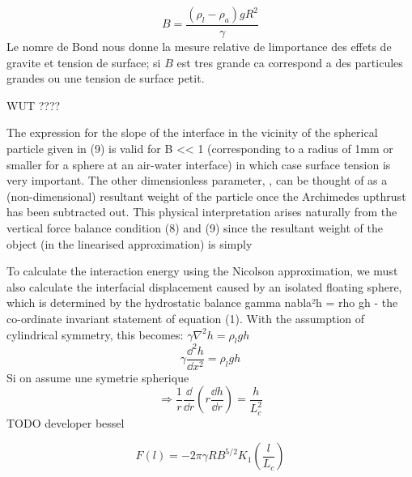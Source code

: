     \begin{equation}
        B = \frac{(\rho_l-\rho_{a})gR^2}{\gamma}
    \end{equation}
    Le nomre de Bond nous donne la mesure relative de limportance des effets de gravite et tension de surface; si $B$ est tres grande ca correspond a des particules grandes ou une tension de surface petit. 

    WUT ????

    The expression for the slope of the interface in the vicinity of the spherical particle given in (9) is valid for B << 1 (corresponding to a radius of  1mm or smaller for a sphere at an air-water interface) in which case surface tension is very important. The other dimensionless parameter, , can be thought of as a (non-dimensional) resultant weight of the particle once the Archimedes upthrust has been subtracted out. This physical interpretation arises naturally from the vertical force balance condition (8) and (9) since the resultant weight of the object (in the linearised approximation) is simply 

    To calculate the interaction energy using the Nicolson
    approximation, we must also calculate the interfacial displacement caused by an isolated floating sphere, which is determined by the hydrostatic balance gamma nabla²h = rho gh - the co-ordinate invariant statement of equation (1). With the assumption of cylindrical symmetry, this becomes:
    \(\gamma \nabla^2h = \rho_l g h\)
    \begin{equation}
        \gamma \frac{\dd^2h}{\dd x^2} = \rho_l g h
    \end{equation}
    Si on assume une symetrie spherique
    \begin{equation}
        \Rightarrow \frac{1}{r} \frac{\dd}{\dd r} \left( r\frac{\dd h}{\dd r}\right) = \frac{h}{L_c^2}
    \end{equation}
    TODO developer bessel
    \cite{introtoBessel}

    \begin{equation}
        \label{ForceEntreCheerios}
        F(l) = -2\pi \gamma R B^{5/2} K_1 \left( \frac{l}{L_c}\right)
    \end{equation}
